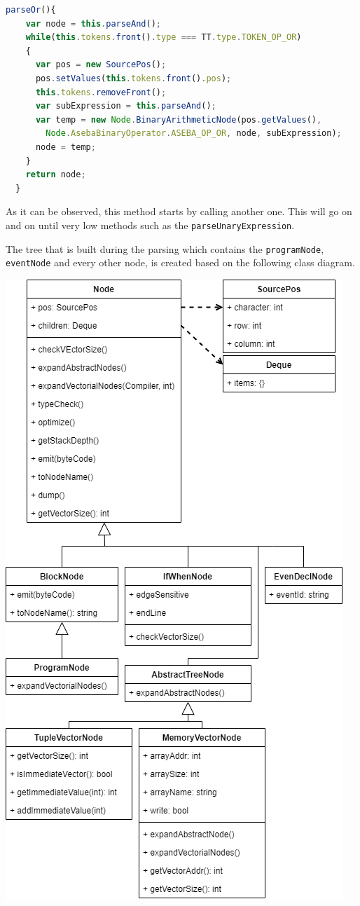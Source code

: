 \documentclass{scrreprt}
\begin{document}
\begin{lstlisting}[language=JavaScript, gobble=2, basicstyle=\ttfamily\small]
  parseOr(){
    var node = this.parseAnd();
    while(this.tokens.front().type === TT.type.TOKEN_OP_OR)
    {
      var pos = new SourcePos();
      pos.setValues(this.tokens.front().pos);
      this.tokens.removeFront();
      var subExpression = this.parseAnd();
      var temp = new Node.BinaryArithmeticNode(pos.getValues(), 
        Node.AsebaBinaryOperator.ASEBA_OP_OR, node, subExpression);
      node = temp;
    }
    return node;
  }
\end{lstlisting}

As it can be observed, this method starts by calling another one. This will go on and on until very low methods such as the \texttt{parseUnaryExpression}.

The tree that is built during the parsing which contains the \texttt{programNode}, \texttt{eventNode} and every other node, is created based on the following class diagram.

\begin{center}
  \includegraphics[scale=0.6]{./tree}
\end{center}
\end{document}
